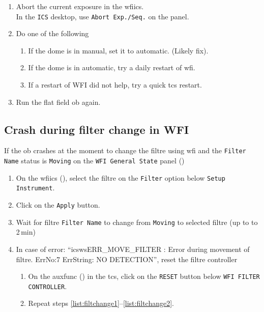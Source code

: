 \documentclass[11pt,fleqn,a4paper]{book}
\begin{document}
\begin{enumerate}
\item Abort the current exposure in the \gls{wfiics}.\\
      In the \texttt{ICS} \gls{desktop}, use \texttt{Abort Exp./Seq.} on the panel. 
\item Do one of the following
   \begin{enumerate}
        \item If the dome is in manual, set it to automatic. (Likely fix).
        \item If the dome is in automatic, try a daily restart of \gls{wfi}.
        \item If a restart of WFI did not help, try a quick \gls{tcs} restart.
   \end{enumerate} 
\item Run the flat field \gls{ob} again.
\end{enumerate}

\subsection{Crash during filter change in WFI}
\label{sec:crashfiltre}

\label{proc:filtrereset}
If the \gls{ob} crashes at the moment to change the filtre using \gls{wfi} and the \texttt{Filter Name} status is \texttt{Moving} on the \texttt{WFI \gls{General State}} panel ()
 \begin{enumerate}
      \item On the \gls{wfiics} (), select the filtre on the \texttt{Filter} option below \texttt{Setup Instrument}.\label{list:filtchange1}
      \item Click on the \texttt{Apply} button.
      \item Wait for filtre \texttt{Filter Name} to change from \texttt{Moving} to selected filtre (up to to 2\,min)\label{list:filtchange2}
      \item In case of error: ``icswsERR\_MOVE\_FILTER : Error during movement of filtre. ErrNo:7 ErrString: NO DETECTION'', reset the filtre controller
           \begin{enumerate}
           \item On the \gls{auxfunc} () in the \gls{tcs}, click on the \texttt{RESET} button below \texttt {WFI FILTER CONTROLLER}.
           \item Repeat steps \ref{list:filtchange1}--\ref{list:filtchange2}.
           \end{enumerate}
 \end{enumerate}
 
\end{document}
